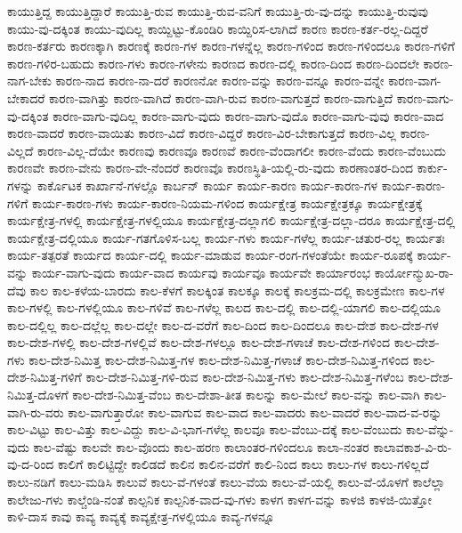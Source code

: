 {ಕಾಯುತ್ತಿದ್ದ
ಕಾಯುತ್ತಿದ್ದಾರೆ
ಕಾಯುತ್ತಿ-ರುವ
ಕಾಯುತ್ತಿ-ರುವ-ವನಿಗೆ
ಕಾಯುತ್ತಿ-ರು-ವು-ದನ್ನು
ಕಾಯುತ್ತಿ-ರುವುವು
ಕಾಯು-ವು-ದಕ್ಕಿಂತ
ಕಾಯು-ವುದಿಲ್ಲ
ಕಾಯ್ದಿಟ್ಟು-ಕೊಂಡಿರಿ
ಕಾಯ್ದಿರಿಸ-ಲಾಗಿದೆ
ಕಾರಣ
ಕಾರಣ-ಕರ್ತ-ರಲ್ಲ-ದಿದ್ದರೆ
ಕಾರಣ-ಕರ್ತರು
ಕಾರಣಕ್ಕಾಗಿ
ಕಾರಣಕ್ಕೆ
ಕಾರಣ-ಗಳ
ಕಾರಣ-ಗಳನ್ನೆಲ್ಲ
ಕಾರಣ-ಗಳಿಂದ
ಕಾರಣ-ಗಳಿಂದಲೂ
ಕಾರಣ-ಗಳಿಗೆ
ಕಾರಣ-ಗಳಿರ-ಬಹುದು
ಕಾರಣ-ಗಳು
ಕಾರಣ-ಗಳೇನು
ಕಾರಣದ
ಕಾರಣ-ದಲ್ಲಿ
ಕಾರಣ-ದಿಂದ
ಕಾರಣ-ದಿಂದಲೇ
ಕಾರಣ-ನಾಗ-ಬೇಕು
ಕಾರಣ-ನಾದ
ಕಾರಣ-ನಾ-ದರೆ
ಕಾರಣನೋ
ಕಾರಣ-ವನ್ನು
ಕಾರಣ-ವನ್ನೂ
ಕಾರಣ-ವನ್ನೇ
ಕಾರಣ-ವಾಗ-ಬೇಕಾದರೆ
ಕಾರಣ-ವಾಗಿತ್ತು
ಕಾರಣ-ವಾಗಿದೆ
ಕಾರಣ-ವಾಗಿ-ರುವ
ಕಾರಣ-ವಾಗುತ್ತದೆ
ಕಾರಣ-ವಾಗುತ್ತಿದೆ
ಕಾರಣ-ವಾಗು-ವು-ದಕ್ಕಿಂತ
ಕಾರಣ-ವಾಗು-ವುದಿಲ್ಲ
ಕಾರಣ-ವಾಗು-ವುದು
ಕಾರಣ-ವಾಗು-ವುದೊ
ಕಾರಣ-ವಾಗು-ವುವು
ಕಾರಣ-ವಾದ
ಕಾರಣ-ವಾದರೆ
ಕಾರಣ-ವಾಯಿತು
ಕಾರಣ-ವಿದೆ
ಕಾರಣ-ವಿದ್ದರೆ
ಕಾರಣ-ವಿರ-ಬೇಕಾಗುತ್ತದೆ
ಕಾರಣ-ವಿಲ್ಲ
ಕಾರಣ-ವಿಲ್ಲದೆ
ಕಾರಣ-ವಿಲ್ಲ-ದೆಯೇ
ಕಾರಣವು
ಕಾರಣವೂ
ಕಾರಣವೆ
ಕಾರಣ-ವೆಂದಾಗಲೀ
ಕಾರಣ-ವೆಂದು
ಕಾರಣ-ವೆಂಬುದು
ಕಾರಣವೇ
ಕಾರಣ-ವೇನು
ಕಾರಣ-ವೇ-ನೆಂದರೆ
ಕಾರಣವೊ
ಕಾರಣಸ್ಥಿತಿ-ಯಲ್ಲಿ-ರು-ವುದು
ಕಾರಣಾಂತರ-ದಿಂದ
ಕಾರ್ಕು-ಗಳನ್ನು
ಕಾರ್ಕೊಟಕ
ಕಾರ್ಖಾನೆ-ಗಳಲ್ಲೊ
ಕಾರ್ಬನ್
ಕಾರ್ಯ
ಕಾರ್ಯ-ಕಾರಣ
ಕಾರ್ಯ-ಕಾರಣ-ಗಳ
ಕಾರ್ಯ-ಕಾರಣ-ಗಳಿಗೆ
ಕಾರ್ಯ-ಕಾರಣ-ಗಳು
ಕಾರ್ಯ-ಕಾರಣ-ನಿಯಮ-ಗಳಿಂದ
ಕಾರ್ಯಕ್ಷೇತ್ರ
ಕಾರ್ಯಕ್ಷೇತ್ರಕ್ಕೂ
ಕಾರ್ಯಕ್ಷೇತ್ರಕ್ಕೆ
ಕಾರ್ಯಕ್ಷೇತ್ರ-ಗಳಲ್ಲಿ
ಕಾರ್ಯಕ್ಷೇತ್ರ-ಗಳಲ್ಲಿಯೂ
ಕಾರ್ಯಕ್ಷೇತ್ರ-ದಲ್ಲಾಗಲಿ
ಕಾರ್ಯಕ್ಷೇತ್ರ-ದಲ್ಲಾ-ದರೂ
ಕಾರ್ಯಕ್ಷೇತ್ರ-ದಲ್ಲಿ
ಕಾರ್ಯಕ್ಷೇತ್ರ-ದಲ್ಲಿಯೂ
ಕಾರ್ಯ-ಗತಗೊಳಿಸ-ಬಲ್ಲ
ಕಾರ್ಯ-ಗಳು
ಕಾರ್ಯ-ಗಳೆಲ್ಲ
ಕಾರ್ಯ-ಚತುರ-ರಲ್ಲ
ಕಾರ್ಯತಃ
ಕಾರ್ಯ-ತತ್ಪರತೆ
ಕಾರ್ಯದ
ಕಾರ್ಯ-ದಲ್ಲಿ
ಕಾರ್ಯ-ಮಾಡುವ
ಕಾರ್ಯ-ರಂಗ-ಗಳಂತೆಯೇ
ಕಾರ್ಯ-ರೂಪಕ್ಕೆ
ಕಾರ್ಯ-ವನ್ನು
ಕಾರ್ಯ-ವಾಗು-ವುದು
ಕಾರ್ಯ-ವಾದ
ಕಾರ್ಯವು
ಕಾರ್ಯವೂ
ಕಾರ್ಯವೇ
ಕಾರ್ಯಾರಂಭ
ಕಾರ್ಯೋನ್ಮುಖ-ರಾ-ದೆವು
ಕಾಲ
ಕಾಲ-ಕಳೆಯ-ಬಾರದು
ಕಾಲ-ಕೆಳಗೆ
ಕಾಲಕ್ಕಿಂತ
ಕಾಲಕ್ಕೂ
ಕಾಲಕ್ಕೆ
ಕಾಲಕ್ರಮ-ದಲ್ಲಿ
ಕಾಲಕ್ರಮೇಣ
ಕಾಲ-ಗಳ
ಕಾಲ-ಗಳಲ್ಲಿ
ಕಾಲ-ಗಳಲ್ಲಿಯೂ
ಕಾಲ-ಗಳಿವೆ
ಕಾಲ-ಗಳೆಲ್ಲ
ಕಾಲದ
ಕಾಲ-ದಲ್ಲಿ
ಕಾಲ-ದಲ್ಲಿ-ಯಾಗಲಿ
ಕಾಲ-ದಲ್ಲಿಯೂ
ಕಾಲ-ದಲ್ಲಿಲ್ಲ
ಕಾಲ-ದಲ್ಲೆಲ್ಲ
ಕಾಲ-ದಲ್ಲೇ
ಕಾಲ-ದ-ವರೆಗೆ
ಕಾಲ-ದಿಂದ
ಕಾಲ-ದಿಂದಲೂ
ಕಾಲ-ದೇಶ
ಕಾಲ-ದೇಶ-ಗಳ
ಕಾಲ-ದೇಶ-ಗಳಲ್ಲಿ
ಕಾಲ-ದೇಶ-ಗಳಲ್ಲಿವೆ
ಕಾಲ-ದೇಶ-ಗಳಲ್ಲೂ
ಕಾಲ-ದೇಶ-ಗಳಾಚೆ
ಕಾಲ-ದೇಶ-ಗಳಿಂದ
ಕಾಲ-ದೇಶ-ಗಳು
ಕಾಲ-ದೇಶ-ನಿಮಿತ್ತ
ಕಾಲ-ದೇಶ-ನಿಮಿತ್ತ-ಗಳ
ಕಾಲ-ದೇಶ-ನಿಮಿತ್ತ-ಗಳಾಚೆ
ಕಾಲ-ದೇಶ-ನಿಮಿತ್ತ-ಗಳಿಂದ
ಕಾಲ-ದೇಶ-ನಿಮಿತ್ತ-ಗಳಿಗೆ
ಕಾಲ-ದೇಶ-ನಿಮಿತ್ತ-ಗಳಿ-ರುವ
ಕಾಲ-ದೇಶ-ನಿಮಿತ್ತ-ಗಳು
ಕಾಲ-ದೇಶ-ನಿಮಿತ್ತ-ಗಳೆಂಬ
ಕಾಲ-ದೇಶ-ನಿಮಿತ್ತ-ದೊಳಗೆ
ಕಾಲ-ದೇಶ-ನಿಮಿತ್ತ-ವೆಂಬ
ಕಾಲ-ದೇಶಾ-ತೀತ
ಕಾಲನ್ನು
ಕಾಲ-ಮೇಲೆ
ಕಾಲ-ವನ್ನು
ಕಾಲ-ವಾಗಿ
ಕಾಲ-ವಾಗಿ-ರು-ವರು
ಕಾಲ-ವಾಗುತ್ತಾರೋ
ಕಾಲ-ವಾಗುವ
ಕಾಲ-ವಾದ
ಕಾಲ-ವಾದರು
ಕಾಲ-ವಾದರೆ
ಕಾಲ-ವಾದ-ವ-ರನ್ನು
ಕಾಲ-ವಿಟ್ಟು
ಕಾಲ-ವಿತ್ತು
ಕಾಲ-ವಿದ್ದು
ಕಾಲ-ವಿ-ಭಾಗ-ಗಳೆಲ್ಲ
ಕಾಲವೂ
ಕಾಲ-ವೆಂಬು-ದಕ್ಕೆ
ಕಾಲ-ವೆಂಬುದು
ಕಾಲ-ವೆನ್ನು-ವುದು
ಕಾಲ-ವೆಷ್ಟು
ಕಾಲವೇ
ಕಾಲ-ವೊಂದು
ಕಾಲ-ಹರಣ
ಕಾಲಾಂತರ-ಗಳಿಂದಲೂ
ಕಾಲಾ-ನಂತರ
ಕಾಲಾವಕಾಶ-ವಿ-ರು-ವು-ದ-ರಿಂದ
ಕಾಲಿಗೆ
ಕಾಲಿಟ್ಟಿದ್ದೇ
ಕಾಲಿಡದೆ
ಕಾಲಿನ
ಕಾಲಿನ-ವರೆಗೆ
ಕಾಲಿ-ನಿಂದ
ಕಾಲು
ಕಾಲು-ಗಳ
ಕಾಲು-ಗಳಿಲ್ಲದೆ
ಕಾಲು-ನಡಿಗೆ
ಕಾಲು-ಮಡಿಸಿ
ಕಾಲುವೆ
ಕಾಲು-ವೆ-ಗಳಂತೆ
ಕಾಲು-ವೆಯ
ಕಾಲು-ವೆ-ಯಲ್ಲಿ
ಕಾಲು-ವೆ-ಯೊಳಗೆ
ಕಾಲೆಲ್ಲಾ
ಕಾಲೇಜು-ಗಳು
ಕಾಲ್ಚೆಂಡಿ-ನಂತೆ
ಕಾಲ್ಪನಿಕ
ಕಾಲ್ಪನಿಕ-ವಾದ-ವು-ಗಳು
ಕಾಳಗ
ಕಾಳಗ-ವನ್ನು
ಕಾಳಜಿ
ಕಾಳಜಿ-ಯಿತ್ತೋ
ಕಾಳಿ-ದಾಸ
ಕಾವು
ಕಾವ್ಯ
ಕಾವ್ಯಕ್ಕೆ
ಕಾವ್ಯಕ್ಷೇತ್ರ-ಗಳಲ್ಲಿಯೂ
ಕಾವ್ಯ-ಗಳನ್ನೂ
}
